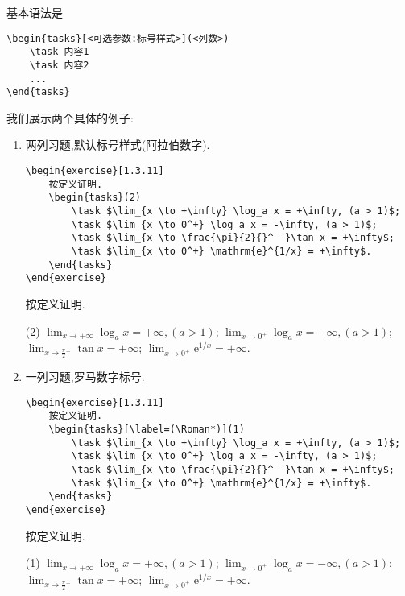 \documentclass[lang=cn,12pt,scheme=chinese,mode=simple,black]{elegantbook}
\begin{document}
基本语法是
\begin{lstlisting}
\begin{tasks}[<可选参数:标号样式>](<列数>)
    \task 内容1
    \task 内容2
    ...
\end{tasks}
\end{lstlisting}

我们展示两个具体的例子:

\begin{enumerate}
    \item 两列习题,默认标号样式(阿拉伯数字).
\begin{lstlisting}
\begin{exercise}[1.3.11]
    按定义证明.
    \begin{tasks}(2)
        \task $\lim_{x \to +\infty} \log_a x = +\infty, (a > 1)$;
        \task $\lim_{x \to 0^+} \log_a x = -\infty, (a > 1)$;
        \task $\lim_{x \to \frac{\pi}{2}{}^- }\tan x = +\infty$;
        \task $\lim_{x \to 0^+} \mathrm{e}^{1/x} = +\infty$.
    \end{tasks}
\end{exercise}
\end{lstlisting}

\begin{resultbox}
\begin{exercise}[1.3.11]
    按定义证明.
    \begin{tasks}(2)
        \task $\lim_{x \to +\infty} \log_a x = +\infty, (a > 1)$;
        \task $\lim_{x \to 0^+} \log_a x = -\infty, (a > 1)$;
        \task $\lim_{x \to \frac{\pi}{2}{}^- }\tan x = +\infty$;
        \task $\lim_{x \to 0^+} \mathrm{e}^{1/x} = +\infty$.
    \end{tasks}
\end{exercise}
\end{resultbox}

    \item 一列习题,罗马数字标号.
\begin{lstlisting}
\begin{exercise}[1.3.11]
    按定义证明.
    \begin{tasks}[\label=(\Roman*)](1)
        \task $\lim_{x \to +\infty} \log_a x = +\infty, (a > 1)$;
        \task $\lim_{x \to 0^+} \log_a x = -\infty, (a > 1)$;
        \task $\lim_{x \to \frac{\pi}{2}{}^- }\tan x = +\infty$;
        \task $\lim_{x \to 0^+} \mathrm{e}^{1/x} = +\infty$.
    \end{tasks}
\end{exercise}
\end{lstlisting}

\begin{resultbox}
\begin{exercise}[1.3.11]
    按定义证明.
    \begin{tasks}[label=(\Roman*)](1)
        \task $\lim_{x \to +\infty} \log_a x = +\infty, (a > 1)$;
        \task $\lim_{x \to 0^+} \log_a x = -\infty, (a > 1)$;
        \task $\lim_{x \to \frac{\pi}{2}{}^- }\tan x = +\infty$;
        \task $\lim_{x \to 0^+} \mathrm{e}^{1/x} = +\infty$.
    \end{tasks}
\end{exercise}
\end{resultbox}
\end{enumerate}
\end{document}
